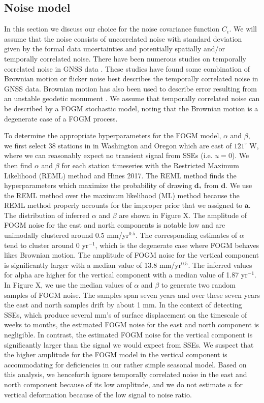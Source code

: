 \documentclass[10pt,a4paper]{article}
\begin{document}
\subsection{Noise model}
In this section we discuss our choice for the noise covariance function $C_\epsilon$. We will assume that the noise consists of uncorrelated noise with standard deviation given by the formal data uncertainties and potentially spatially and/or temporally correlated noise. There have been numerous studies on temporally correlated noise in GNSS data \citep[e.g.,]{Zhang1997,Mao1999,Williams2004,Langbein2008}. These studies have found some combination of Brownian motion or flicker noise best describes the temporally correlated noise in GNSS data. Brownian motion has also been used to describe error resulting from an unstable geodetic monument \citep[e.g.,][]{Wyatt1982,Wyatt1989}. We assume that temporally correlated noise can be described by a FOGM stochastic model, noting that the Brownian motion is a degenerate case of a FOGM process. 

To determine the appropriate hyperparameters for the FOGM model, $\alpha$ and $\beta$, we first select 38 stations in in Washington and Oregon which are east of $121^\circ$ W, where we can reasonably expect no transient signal from SSEs (i.e. $u = 0$). We then find $\alpha$ and $\beta$ for each station timeseries with the Restricted Maximum Likelihood (REML) method \cite[e.g.,][]{Harville1974,Cressie1992} and Hines 2017. The REML method finds the hyperparameters which maximize the probability of drawing $\bm{d}_*$ from $\bm{d}$. We use the REML method over the maximum likelihood (ML) method \citep[e.g.,][]{Langbein1997} because the REML method properly accounts for the improper prior that we assigned to $\bm{a}$. The distribution of inferred $\alpha$ and $\beta$ are shown in Figure X. The amplitude of FOGM noise for the east and north components is notable low and are unimodally clustered around 0.5 mm/yr$^{0.5}$. The corresponding estimates of $\alpha$ tend to cluster around 0 yr$^{-1}$, which is the degenerate case where FOGM behaves likes Brownian motion.  The amplitude of FOGM noise for the vertical component is significantly larger with a median value of 13.8 mm/yr$^{0.5}$. The inferred values for alpha are higher for the vertical component with a median value of 1.87 yr$^{-1}$. In Figure X, we use the median values of $\alpha$ and $\beta$ to generate two random samples of FOGM noise. The samples span seven years and over these seven years the east and north samples drift by about 1 mm. In the context of detecting SSEs, which produce several mm's of surface displacement on the timescale of weeks to months, the estimated FOGM noise for the east and north component is negligible. In contrast, the estimated FOGM noise for the vertical component is significantly larger than the signal we would expect from SSEs. We suspect that the higher amplitude for the FOGM model in the vertical component is accommodating for deficiencies in our rather simple seasonal model. Based on this analysis, we henceforth ignore temporally correlated noise in the east and north component because of its low amplitude, and we do not estimate $u$ for vertical deformation because of the low signal to noise ratio.
\end{document}
